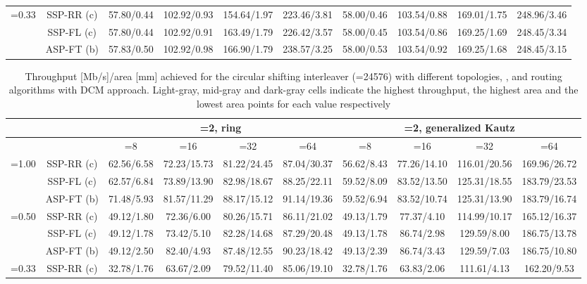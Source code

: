 \documentclass[10pt,twocolumn,journal]{IEEEtran}
\begin{document}
\begin{table*}[t!]
{\begin{tabular}{|c|c|c|c|c|c|c|c|c|c|}
\hline
\multirow{3}{*}{=0.33} & SSP-RR (c) & 57.80/0.44 & 102.92/0.93 & 154.64/1.97 & 223.46/3.81 & 58.00/0.46 & 103.54/0.88 & 169.01/1.75 & 248.96/3.46 \\
& SSP-FL (c) & 57.80/0.44 & 102.92/0.91 & 163.49/1.79 & 226.42/3.57 & 58.00/0.45 & 103.54/0.86 & 169.25/1.69 & 248.45/3.34 \\
& ASP-FT (b) & 57.83/0.50 & 102.92/0.98 & 166.90/1.79 & 238.57/3.25 & 58.00/0.53 & 103.54/0.92 & 169.25/1.68 & 248.45/3.15 \\
\hline
  \end{tabular}
}
\end{table*}
\begin{table*}[t!]
  \centering
  \caption{Throughput [Mb/s]/area [mm] achieved for the circular shifting interleaver (=24576) with different 
topologies, ,  and routing algorithms with DCM approach. 
Light-gray, mid-gray and dark-gray cells indicate the highest throughput, the highest area and the lowest area points 
for each  value respectively} \label{tab:mhoms_results}
   { \scriptsize
  \begin{tabular}{|c|c|c|c|c|c|c|c|c|c|}
\hline
& 	 & \multicolumn{4}{c|}{=2, ring} & \multicolumn{4}{c|}{=2, generalized Kautz} \\
\hline
& 	 & =8 & =16 & =32 & =64 & =8 & =16 & =32 & =64 \\
\hline
\multirow{3}{*}{=1.00} & SSP-RR (c) & 62.56/6.58 & 72.23/15.73 & 81.22/24.45 & \cellcolor[gray]{0.8} 87.04/30.37 & 56.62/8.43 & 77.26/14.10 & 116.01/20.56 & \cellcolor[gray]{0.8} 169.96/26.72 \\
& SSP-FL (c) & 62.57/6.84 & 73.89/13.90 & 82.98/18.67 & 88.25/22.11 & 59.52/8.09 & 83.52/13.50 & 125.31/18.55 & 183.79/23.53 \\
& ASP-FT (b) & 71.48/5.93 & 81.57/11.29 & 88.17/15.12 & \cellcolor[gray]{0.9} 91.14/19.36 & 59.52/6.94 & 83.52/10.74 & 125.31/13.90 & 183.79/16.74 \\
\hline
\multirow{3}{*}{=0.50} & SSP-RR (c) & 49.12/1.80 & 72.36/6.00 & 80.26/15.71 & 86.11/21.02 & 49.13/1.79 & 77.37/4.10 & 114.99/10.17 & 165.12/16.37 \\
& SSP-FL (c) & 49.12/1.78 & 73.42/5.10 & 82.28/14.68 & 87.29/20.48 & 49.13/1.78 & 86.74/2.98 & 129.59/8.00 & 186.75/13.78 \\
& ASP-FT (b) & 49.12/2.50 & 82.40/4.93 & 87.48/12.55 & 90.23/18.42 & 49.13/2.39 & 86.74/3.43 & 129.59/7.03 & \cellcolor[gray]{0.9} 186.75/10.80 \\
\hline
\multirow{3}{*}{=0.33} & SSP-RR (c) & \cellcolor[gray]{0.7} 32.78/1.76 & 63.67/2.09 & 79.52/11.40 & 85.06/19.10 & 32.78/1.76 & 63.83/2.06 & 111.61/4.13 & 162.20/9.53 \\

\end{tabular}}
\end{table*}
\end{document}
